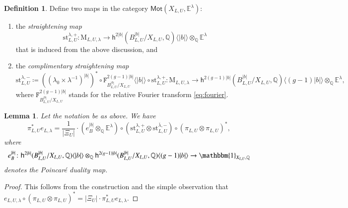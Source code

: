 \documentclass[12pt]{amsart}
\numberwithin{equation}{section}
\theoremstyle{plain}
\newtheorem{lem}[proposition]{Lemma}
\theoremstyle{definition}
\newtheorem{definition}[proposition]{Definition}
\theoremstyle{remark}
\renewcommand{\d}[1]{\mathbb{#1}}
\renewcommand{\r}[1]{\mathrm{#1}}
\renewcommand{\sf}[1]{\mathsf{#1}}
\renewcommand{\(}{\left(}
\renewcommand{\)}{\right)}
\newcommand{\ang}[1]{\langle{#1}\rangle}
\newcommand{\ol}[1]{\overline{#1}{}}
\newcommand{\dE}{\d E}
\newcommand{\dQ}{\d Q}
\newcommand{\rM}{\r M}
\newcommand{\sfh}{\sf h}
\newcommand{\tF}{\mathtt{F}}
\newcommand{\st}{\r{st}}
\newcommand{\Mot}{\sf{Mot}}
\begin{document}
\begin{definition}\label{de:straightening}
Define two maps in the category $\Mot(X_{L,U},\dE^\lambda)$:
\begin{enumerate}
  \item the \emph{straightening map}
      \[
      \st_{L,U}^{\lambda,+}\colon\rM_{L,U,\lambda}\to\sfh^{2|b|}(B_{L,U}^{|b|}/X_{L,U},\dQ)\ang{|b|}\otimes_\dQ\dE^\lambda
      \]
      that is induced from the above discussion, and

  \item the \emph{complimentary straightening map}
      \[
      \st_{L,U}^{\lambda,-}\coloneqq
      ((\lambda_0\times\lambda^{-1})^{|b|})^*\circ\tF^{2(g-1)|b|}_{B_{L,U}^{|b|}/X_{L,U}}\ang{|b|}\circ\st_{L,U}^{\lambda,+}
      \colon\rM_{L,U,\lambda}\to\sfh^{2(g-1)|b|}(B_{L,U}^{|b|}/X_{L,U},\dQ)\ang{(g-1)|b|}\otimes_\dQ\dE^\lambda,
      \]
      where $\tF^{2(g-1)|b|}_{B_{L,U}^{|b|}/X_{L,U}}$ stands for the relative Fourier transform \eqref{eq:fourier}.
\end{enumerate}
\end{definition}


\begin{lem}\label{le:straightening}
Let the notation be as above. We have
\[
\pi_{L,U}^*e_{L,\lambda}=\frac{1}{|\Xi_U|}\cdot (e_B^{|b|}\otimes_\dQ\dE^\lambda) \circ(\st_{L,U}^{\lambda,+}\otimes\st_{L,U}^{\ol\lambda,-})\circ(\pi_{L,U}\otimes\pi_{L,U})^*,
\]
where
\[
e_B^{|b|}\colon\sfh^{2|b|}(B_{L,U}^{|b|}/X_{L,U},\dQ)\ang{|b|}\otimes_\dQ
\sfh^{2(g-1)|b|}(B_{L,U}^{|b|}/X_{L,U},\dQ)\ang{(g-1)|b|}\to\mathbbm{1}_{X_{L,U},\dQ}
\]
denotes the Poincar\'{e} duality map.
\end{lem}

\begin{proof}
This follows from the construction and the simple observation that $e_{L,U,\lambda}\circ(\pi_{L,U}\otimes\pi_{L,U})^*=|\Xi_U|\cdot\pi_{L,U}^*e_{L,\lambda}$.
\end{proof}
\end{document}
